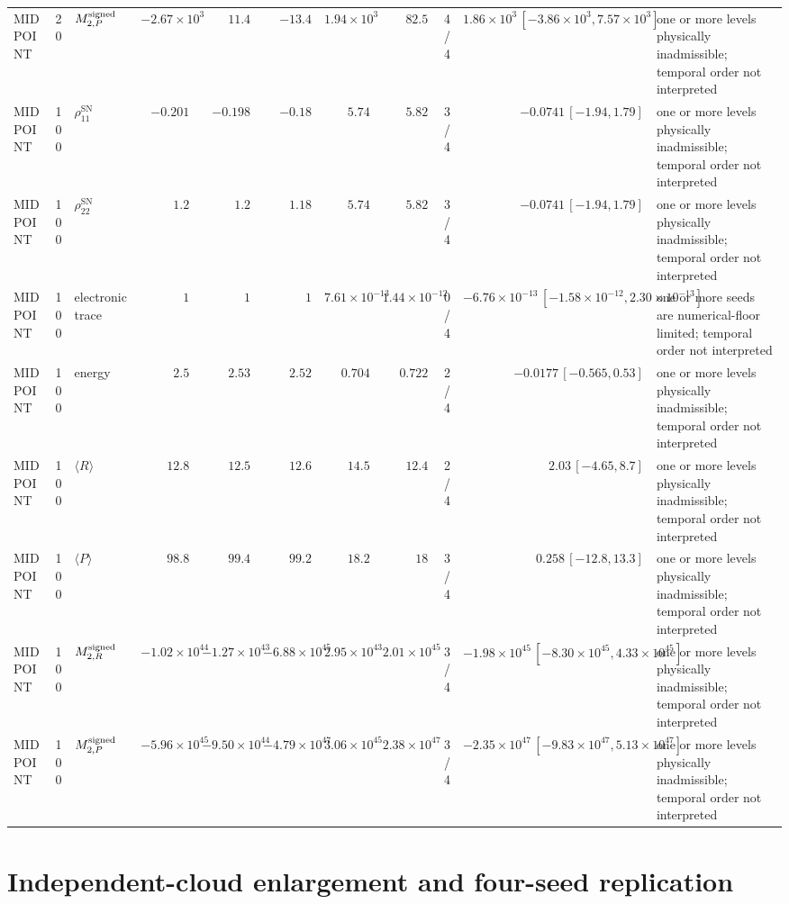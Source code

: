 \documentclass[
  11pt,
  letterpaper,
  onehalfspacing,
  normalmargins,
  equalmargins,
  oneside
]{ut-thesis}
\begin{document}
\begin{landscape}
\begin{longtable}{l r l r r r r r r r L{0.15\textwidth}}
MIDPOINT & 20 & $M^{\rm signed}_{2,P}$ & $-2.67\times10^{3}$ & $11.4$ & $-13.4$ & $1.94\times10^{3}$ & $82.5$ & 4/4 & $1.86\times10^{3}\,[-3.86\times10^{3},7.57\times10^{3}]$ & one or more levels physically inadmissible; temporal order not interpreted \\
MIDPOINT & 100 & $\rho_{11}^{\mathrm{SN}}$ & $-0.201$ & $-0.198$ & $-0.18$ & $5.74$ & $5.82$ & 3/4 & $-0.0741\,[-1.94,1.79]$ & one or more levels physically inadmissible; temporal order not interpreted \\
MIDPOINT & 100 & $\rho_{22}^{\mathrm{SN}}$ & $1.2$ & $1.2$ & $1.18$ & $5.74$ & $5.82$ & 3/4 & $-0.0741\,[-1.94,1.79]$ & one or more levels physically inadmissible; temporal order not interpreted \\
MIDPOINT & 100 & electronic trace & $1$ & $1$ & $1$ & $7.61\times10^{-13}$ & $1.44\times10^{-12}$ & 0/4 & $-6.76\times10^{-13}\,[-1.58\times10^{-12},2.30\times10^{-13}]$ & one or more seeds are numerical-floor limited; temporal order not interpreted \\
MIDPOINT & 100 & energy & $2.5$ & $2.53$ & $2.52$ & $0.704$ & $0.722$ & 2/4 & $-0.0177\,[-0.565,0.53]$ & one or more levels physically inadmissible; temporal order not interpreted \\
MIDPOINT & 100 & $\langle R\rangle$ & $12.8$ & $12.5$ & $12.6$ & $14.5$ & $12.4$ & 2/4 & $2.03\,[-4.65,8.7]$ & one or more levels physically inadmissible; temporal order not interpreted \\
MIDPOINT & 100 & $\langle P\rangle$ & $98.8$ & $99.4$ & $99.2$ & $18.2$ & $18$ & 3/4 & $0.258\,[-12.8,13.3]$ & one or more levels physically inadmissible; temporal order not interpreted \\
MIDPOINT & 100 & $M^{\rm signed}_{2,R}$ & $-1.02\times10^{44}$ & $-1.27\times10^{43}$ & $-6.88\times10^{45}$ & $2.95\times10^{43}$ & $2.01\times10^{45}$ & 3/4 & $-1.98\times10^{45}\,[-8.30\times10^{45},4.33\times10^{45}]$ & one or more levels physically inadmissible; temporal order not interpreted \\
MIDPOINT & 100 & $M^{\rm signed}_{2,P}$ & $-5.96\times10^{45}$ & $-9.50\times10^{44}$ & $-4.79\times10^{47}$ & $3.06\times10^{45}$ & $2.38\times10^{47}$ & 3/4 & $-2.35\times10^{47}\,[-9.83\times10^{47},5.13\times10^{47}]$ & one or more levels physically inadmissible; temporal order not interpreted \\
\end{longtable}
\endgroup
\end{landscape}

\section{Independent-cloud enlargement and four-seed replication}
\label{sec:results-support-replication}
\end{document}
